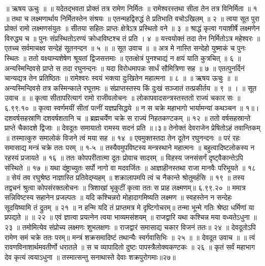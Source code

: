 ॥ ऋषय ऊचुः ॥ ॥
यदेतद्भवता प्रोक्तं तत्र रामेण निर्मितः ॥
रामेश्वरस्तथा सीता तेन तत्र विनिर्मिता ॥ १ ॥
तथा च लक्ष्मणार्थाय निर्मितस्तेन संश्रयः ॥
एतन्महद्विरुद्धं ते प्रतिभाति वचोऽखिलम् ॥ २ ॥
त्वया सूत पुरा प्रोक्तं रामो लक्ष्मणसंयुतः ॥
सीतया सहितः प्राप्तः क्षेत्रेऽत्र प्रस्थितो वने ॥ ३ ॥
श्राद्धं कृत्वा गयाशीर्षे लक्ष्मणेन विरुद्ध्य च ॥
पुनः संप्रस्थितोऽरण्यं क्रोधाविष्टश्च तं प्रति । ४ ॥
यत्त्वयोक्तं तदा तेन निर्मितोऽत्र महेश्वरः ॥
एतच्च सर्वमाचक्ष्व सन्देहं सूतनन्दन ॥ ५ ॥
॥ सूत उवाच ॥ ॥
अत्र मे नास्ति सन्देहो युष्माकं च पुनः स्थितः ॥
ततो वक्ष्याम्यशेषेण श्रूयतां द्विजसत्तमाः ॥
एतत्क्षेत्रं पुनश्चाद्यं न क्षयं याति कुत्रचित् ॥ ६ ॥
अन्यस्मिन्दिवसे प्राप्ते स तदा रघुनन्दनः ॥
यदा विरोधमापन्नः सार्धं सौमित्रिणा सह ॥ ७ ॥
एतत्पुनर्दिनं चान्यद्यत्र तेन प्रतिष्ठितः ॥
रामेश्वरः स्वयं भक्त्या दुःखितेन महात्मना ॥ ८ ॥
॥ ऋषय ऊचुः ॥ ॥
अन्यस्मिन्दिवसे तत्र कस्मिन्काले रघूत्तमः ॥
संप्राप्तस्तस्य किं दुःखं सञ्जातं तत्प्रकीर्तय ॥ ९ ॥ ।
॥ सूत उवाच ॥ ॥
कृत्वा सीतापरित्यागं रामो राजीवलोचनः ॥
लोकापवादसन्त्रस्तस्ततो राज्यं चकार सः ॥ ६.९९.१० ॥
कृत्वा स्वर्णमयीं सीतां पत्नीं यज्ञप्रसिद्धये ॥
न स चक्रे महाभागो भार्यामन्यां कथञ्चन ॥ १॥।
दशवर्षसहस्राणि दशवर्षशतानि च ॥
ब्रह्मचर्येण चक्रे स राज्यं निहतकण्टकम् ॥ १२ ॥
ततो वर्षसहस्रान्ते प्राप्ते चैकादशे द्विजाः ॥
देवदूतः समायातो रामस्य सदनं प्रति ॥।३॥
तेनोक्तं देवराजेन प्रेषितोऽहं तवान्तिकम् ॥
तस्मात्कुरु समालोकं विजने त्वं मया सह ॥ १४ ॥
एवमुक्तस्तदा तेन दूतेन रघुनन्दनः ॥
परं रहः समासाद्य मन्त्रं चक्रे ततः परम् ॥ १-५ ॥
तस्यैवमुपविष्टस्य मन्त्रस्थाने महात्मनः ॥
बहुत्वादिष्टलोकस्य न रहस्यं प्रजायते ॥ १६ ॥
ततः कोपपरीतात्मा दूतः प्रोवाच सादरम् ॥
विहस्य जनसंसर्गं दृष्ट्वैकान्तेऽपि संस्थिते ॥ १७ ॥
यथा दंष्ट्राच्युतः सर्पो नागो वा मदवर्जितः ॥
आज्ञाहीनस्तथा राजा मानवैः परिभूयते ॥ १८ ॥
सेयं तव रघुश्रेष्ठ नाज्ञास्ति प्रतिवेद्म्यहम् ॥
शक्रालापमपि त्वं च नैकान्ते श्रोतुमर्हसि ॥ १९ ॥
तस्य तद्वचनं श्रुत्वा कोपसंरक्तलोचनः ॥
त्रिशाखां भृकुटीं कृत्वा ततः स प्राह लक्ष्मणम्॥ ६.९९.२० ॥
ममात्र सन्निविष्टस्य सहानेन प्रजल्पतः ॥
यदि कश्चिन्नरो मोहादागमिष्यति लक्ष्मण ॥
स्वहस्तेन न सन्देहः सूदयिष्यामि तं द्रुतम् ॥ २१ ॥
न हन्मि यदि तं प्राप्तमत्र मे दृष्टिगोचरम्॥
तन्मा भून्मे गतिः श्रेष्ठा धर्मिणां या प्रपद्यते ॥ ॥ २२ ॥
एवं ज्ञात्वा प्रयत्नेन त्वया भाव्यमसंशयम् ॥
राजद्वारि यथा कश्चिन्न मया वध्यतेऽधुना ॥ २३ ॥
तमोमित्येव संप्रोच्य लक्ष्मणः शुभलक्षणः ॥
राजद्वारं समासाद्य चकार विजनं ततः॥ २४ ॥
देवदूतोऽपि रामेण समं चक्रे ततः परम्॥
मन्त्रं शक्रसमादिष्टं तथान्यैः स्वर्गवासिभिः ॥ २५ ॥
॥ देवदूत उवाच ॥ ॥
त्वं रावणविनाशार्थमवतीर्णो धरातले ॥
स च व्यापादितो दुष्टः पापस्त्रैलोक्यकण्टकः ॥ २६ ॥
कृतं सर्वं महाभाग देव कृत्यं त्वयाऽधुना ॥
तस्मात्सन्तु सनाथास्ते देवाः शक्रपुरोगमाः॥२७॥
